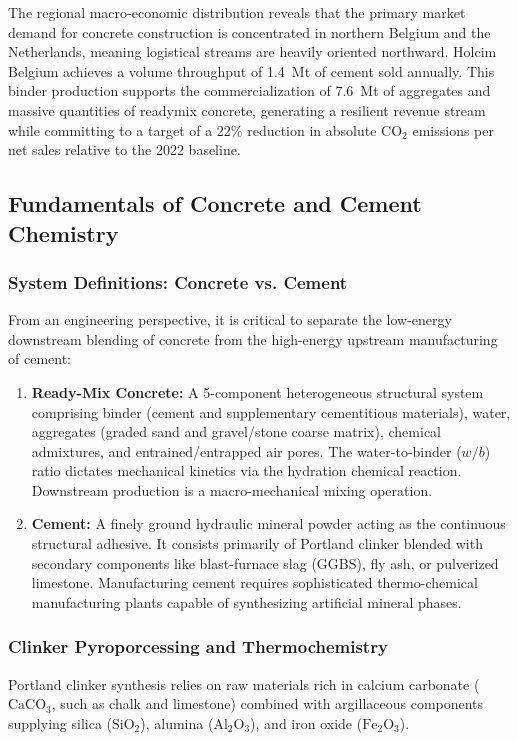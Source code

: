 The regional macro-economic distribution reveals that the primary market demand for concrete construction is concentrated in northern Belgium and the Netherlands, meaning logistical streams are heavily oriented northward. Holcim Belgium achieves a volume throughput of \num{1.4}~Mt of cement sold annually. This binder production supports the commercialization of \num{7.6}~Mt of aggregates and massive quantities of readymix concrete, generating a resilient revenue stream while committing to a target of a \num{22}\% reduction in absolute $\text{CO}_2$ emissions per net sales relative to the 2022 baseline.

\subsection{Fundamentals of Concrete and Cement Chemistry}

\subsubsection{System Definitions: Concrete vs. Cement}
From an engineering perspective, it is critical to separate the low-energy downstream blending of concrete from the high-energy upstream manufacturing of cement:
\begin{enumerate}
    \item \textbf{Ready-Mix Concrete:} A 5-component heterogeneous structural system comprising binder (cement and supplementary cementitious materials), water, aggregates (graded sand and gravel/stone coarse matrix), chemical admixtures, and entrained/entrapped air pores. The water-to-binder ($w/b$) ratio dictates mechanical kinetics via the hydration chemical reaction. Downstream production is a macro-mechanical mixing operation.
    \item \textbf{Cement:} A finely ground hydraulic mineral powder acting as the continuous structural adhesive. It consists primarily of Portland clinker blended with secondary components like blast-furnace slag (GGBS), fly ash, or pulverized limestone. Manufacturing cement requires sophisticated thermo-chemical manufacturing plants capable of synthesizing artificial mineral phases.
\end{enumerate}

\subsubsection{Clinker Pyroporcessing and Thermochemistry}
Portland clinker synthesis relies on raw materials rich in calcium carbonate ($\text{CaCO}_3$, such as chalk and limestone) combined with argillaceous components supplying silica ($\text{SiO}_2$), alumina ($\text{Al}_2\text{O}_3$), and iron oxide ($\text{Fe}_2\text{O}_3$). 


